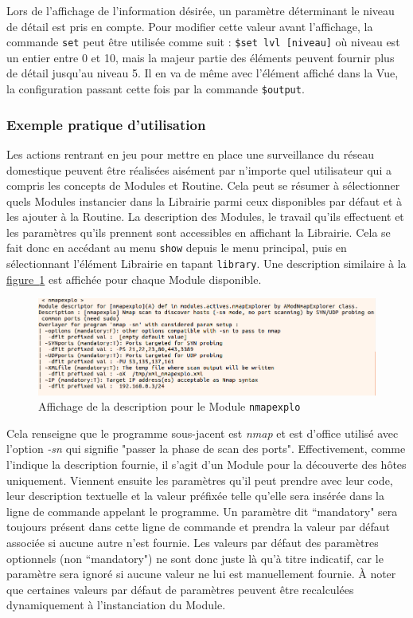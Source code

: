 \documentclass[]{article}
\newcommand{\wordlink}[2]{\hyperref[#1]{#2~\ref{#1}}}
\begin{document}
\par Lors de l'affichage de l'information désirée, un paramètre déterminant le niveau de détail est pris en compte. Pour modifier cette valeur avant l'affichage, la commande \texttt{set} peut être utilisée comme suit : \texttt{\$set lvl [niveau]} où niveau est un entier entre 0 et 10, mais la majeur partie des éléments peuvent fournir plus de détail jusqu'au niveau 5. Il en va de même avec l'élément affiché dans la Vue, la configuration passant cette fois par la commande \texttt{\$output}.

\subsubsection{Exemple pratique d'utilisation}

Les actions rentrant en jeu pour mettre en place une surveillance du réseau domestique peuvent être réalisées aisément par n'importe quel utilisateur qui a compris les concepts de Modules et Routine. Cela peut se résumer à sélectionner quels Modules instancier dans la Librairie parmi ceux disponibles par défaut et à les ajouter à la Routine. La description des Modules, le travail qu'ils effectuent et les paramètres qu'ils prennent sont accessibles en affichant la Librairie. Cela se fait donc en accédant au menu \texttt{show} depuis le menu principal, puis en sélectionnant l'élément Librairie en tapant \texttt{library}. Une description similaire à la \wordlink{showlib}{figure} est affichée pour chaque Module disponible.

\begin{figure}[!ht]
\centering
     \includegraphics[width=0.8\linewidth]{showlib}
     \caption{Affichage de la description pour le Module \texttt{nmapexplo}}
     \label{showlib}
\end{figure}

Cela renseigne que le programme sous-jacent est \textit{nmap} et est d'office utilisé avec l'option \textit{-sn} qui signifie "passer la phase de scan des ports". Effectivement, comme l'indique la description fournie, il s'agit d'un Module pour la découverte des hôtes uniquement. Viennent ensuite les paramètres qu'il peut prendre avec leur code, leur description textuelle et la valeur préfixée telle qu'elle sera insérée dans la ligne de commande appelant le programme. Un paramètre dit ``mandatory" sera toujours présent dans cette ligne de commande et prendra la valeur par défaut associée si aucune autre n'est fournie. Les valeurs par défaut des paramètres optionnels (non ``mandatory") ne sont donc juste là qu'à titre indicatif, car le paramètre sera ignoré si aucune valeur ne lui est manuellement fournie. À noter que certaines valeurs par défaut de paramètres peuvent être recalculées dynamiquement à l’instanciation du Module.\\
\end{document}
